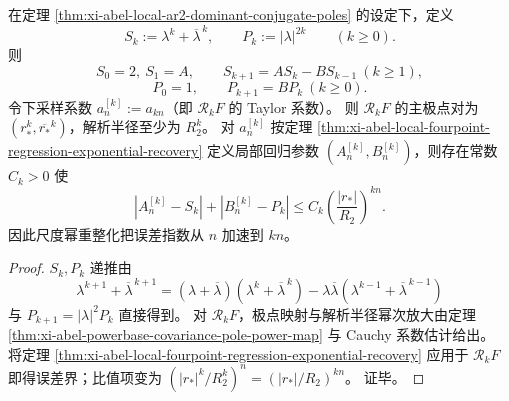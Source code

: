 \begin{corollary}[跨尺度闭合递推与误差指数加速]\label{cor:xi-abel-crossscale-chebyshev-closure-acceleration}
在定理 \ref{thm:xi-abel-local-ar2-dominant-conjugate-poles} 的设定下，定义
\[
S_k:=\lambda^k+\overline\lambda^{\,k},\qquad
P_k:=|\lambda|^{2k}\qquad(k\ge 0).
\]
则
\[
S_0=2,\ S_1=A,\qquad S_{k+1}=AS_k-BS_{k-1}\ (k\ge 1),
\]
\[
P_0=1,\qquad P_{k+1}=BP_k\ (k\ge 0).
\]
令下采样系数 \(a_n^{[k]}:=a_{kn}\)（即 \(\mathcal R_kF\) 的 Taylor 系数）。
则 \(\mathcal R_kF\) 的主极点对为 \((r_\ast^k,\overline{r_\ast}^k)\)，解析半径至少为 \(R_2^k\)。
对 \(a_n^{[k]}\) 按定理 \ref{thm:xi-abel-local-fourpoint-regression-exponential-recovery} 定义局部回归参数
\((A_n^{[k]},B_n^{[k]})\)，则存在常数 \(C_k>0\) 使
\[
|A_n^{[k]}-S_k|+|B_n^{[k]}-P_k|
\le
C_k\left(\frac{|r_\ast|}{R_2}\right)^{kn}.
\]
因此尺度幂重整化把误差指数从 \(n\) 加速到 \(kn\)。
\end{corollary}
\begin{proof}
\(S_k,P_k\) 递推由
\[
\lambda^{k+1}+\overline\lambda^{\,k+1}
=(\lambda+\overline\lambda)(\lambda^k+\overline\lambda^{\,k})-\lambda\overline\lambda(\lambda^{k-1}+\overline\lambda^{\,k-1})
\]
与 \(P_{k+1}=|\lambda|^2P_k\) 直接得到。
对 \(\mathcal R_kF\)，极点映射与解析半径幂次放大由定理
\ref{thm:xi-abel-powerbase-covariance-pole-power-map} 与 Cauchy 系数估计给出。
将定理 \ref{thm:xi-abel-local-fourpoint-regression-exponential-recovery} 应用于 \(\mathcal R_kF\) 即得误差界；比值项变为
\(
(|r_\ast|^k/R_2^k)^n=(|r_\ast|/R_2)^{kn}
\)。
证毕。
\end{proof}

\endinput
